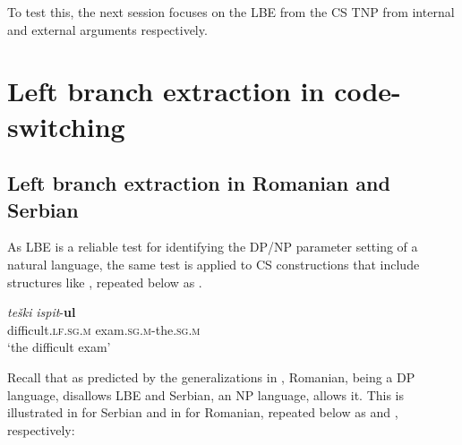 \documentclass[output=paper,
hidelinks,
newtxmath,
]{langscibook}
\begin{document}
To test this, the next session focuses on the LBE from the CS TNP from internal and external arguments respectively.\largerpage

\section{Left branch extraction in code-switching}\label{s5}
\subsection{Left branch extraction in Romanian and Serbian}\label{s5.1}

As LBE is a reliable test for identifying the DP/NP parameter setting of a natural language, the same test is applied to CS constructions that include structures like , repeated below as .

\ea \label{ex10x}
\gll  \textit{teški} \textit{ispit}{}-\textbf{ul}\\
     difficult.\textsc{lf.sg.m} exam\textsc{.sg.m}-the\textsc{.sg.m}\\
     \glt `the difficult exam'
\z

\noindent Recall that as predicted by the generalizations in \citet{Boskovic2008}, Romanian, being a DP language, disallows LBE and Serbian, an NP language, allows it. This is illustrated in  for Serbian and in  for Romanian, repeated below as  and , respectively:


\ea \label{ex13x}
	\z
\z
\end{document}
